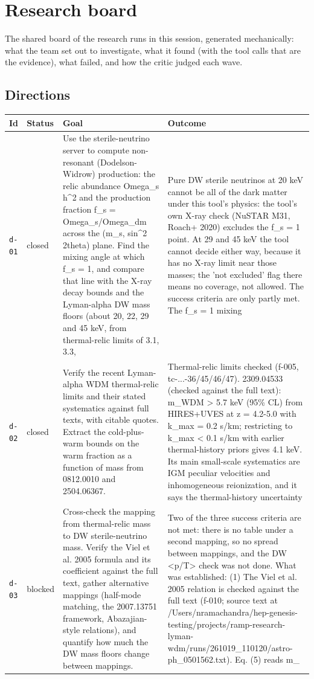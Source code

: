 \documentclass[11pt,a4paper]{article}
\begin{document}
\section{Research board}
\label{app:board}
The shared board of the research runs in this session, generated mechanically: what the team set out to investigate, what it found (with the tool calls that are the evidence), what failed, and how the critic judged each wave.
\subsection{Directions}
\begin{longtable}{@{}p{}p{}p{}p{}@{}}
\toprule Id & Status & Goal & Outcome \\ \midrule \endhead
\texttt{d-01} & closed & Use the sterile-neutrino server to compute non-resonant (Dodelson-Widrow) production: the relic abundance Omega\_s h\textasciicircum{}2 and the production fraction f\_s = Omega\_s/Omega\_dm across the (m\_s, sin\textasciicircum{}2 2theta) plane. Find the mixing angle at which f\_s = 1, and compare that line with the X-ray decay bounds and the Lyman-alpha DW mass floors (about 20, 22, 29 and 45 keV, from thermal-relic limits of 3.1, 3.3, & Pure DW sterile neutrinos at 20 keV cannot be all of the dark matter under this tool's physics: the tool's own X-ray check (NuSTAR M31, Roach+ 2020) excludes the f\_s = 1 point. At 29 and 45 keV the tool cannot decide either way, because it has no X-ray limit near those masses; the 'not excluded' flag there means no coverage, not allowed. The success criteria are only partly met. The f\_s = 1 mixing \\
\texttt{d-02} & closed & Verify the recent Lyman-alpha WDM thermal-relic limits and their stated systematics against full texts, with citable quotes. Extract the cold-plus-warm bounds on the warm fraction as a function of mass from 0812.0010 and 2504.06367. & Thermal-relic limits checked (f-005, tc-...-36/45/46/47). 2309.04533 (checked against the full text): m\_WDM \textgreater{} 5.7 keV (95\% CL) from HIRES+UVES at z = 4.2-5.0 with k\_max = 0.2 s/km; restricting to k\_max \textless{} 0.1 s/km with earlier thermal-history priors gives 4.1 keV. Its main small-scale systematics are IGM peculiar velocities and inhomogeneous reionization, and it says the thermal-history uncertainty \\
\texttt{d-03} & blocked & Cross-check the mapping from thermal-relic mass to DW sterile-neutrino mass. Verify the Viel et al. 2005 formula and its coefficient against the full text, gather alternative mappings (half-mode matching, the 2007.13751 framework, Abazajian-style relations), and quantify how much the DW mass floors change between mappings. & Two of the three success criteria are not met: there is no table under a second mapping, so no spread between mappings, and the DW \textless{}p/T\textgreater{} check was not done. What was established: (1) The Viel et al. 2005 relation is checked against the full text (f-010; source text at /Users/nramachandra/hep-genesis-testing/projects/ramp-research-lyman-wdm/runs/261019\_110120/astro-ph\_0501562.txt). Eq. (5) reads m\_ \\

\end{longtable}
\end{document}

